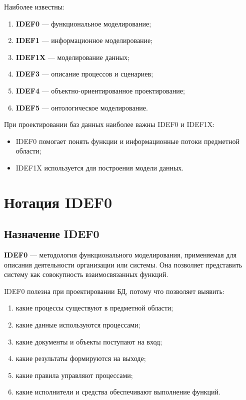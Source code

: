 \documentclass[12pt,a4paper]{article}
\theoremstyle{remark}
\begin{document}
Наиболее известны:

\begin{enumerate}
    \item \textbf{IDEF0} --- функциональное моделирование;
    \item \textbf{IDEF1} --- информационное моделирование;
    \item \textbf{IDEF1X} --- моделирование данных;
    \item \textbf{IDEF3} --- описание процессов и сценариев;
    \item \textbf{IDEF4} --- объектно-ориентированное проектирование;
    \item \textbf{IDEF5} --- онтологическое моделирование.
\end{enumerate}

При проектировании баз данных наиболее важны IDEF0 и IDEF1X:

\begin{itemize}
    \item IDEF0 помогает понять функции и информационные потоки предметной области;
    \item IDEF1X используется для построения модели данных.
\end{itemize}

\section{Нотация IDEF0}

\subsection{Назначение IDEF0}

\textbf{IDEF0} --- методология функционального моделирования, применяемая для описания деятельности организации или системы. Она позволяет представить систему как совокупность взаимосвязанных функций.

IDEF0 полезна при проектировании БД, потому что позволяет выявить:

\begin{enumerate}
    \item какие процессы существуют в предметной области;
    \item какие данные используются процессами;
    \item какие документы и объекты поступают на вход;
    \item какие результаты формируются на выходе;
    \item какие правила управляют процессами;
    \item какие исполнители и средства обеспечивают выполнение функций.
\end{enumerate}
\end{document}
